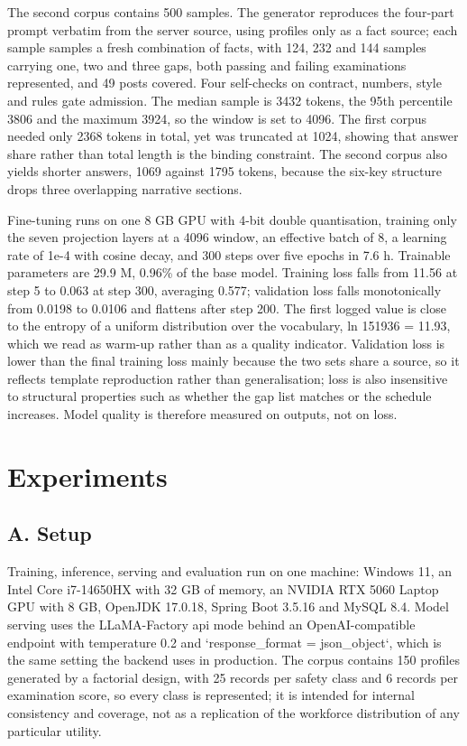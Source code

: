 \documentclass[conference]{IEEEtran}
\begin{document}
The second corpus contains 500 samples. The generator reproduces the four-part prompt verbatim from the server source, using profiles only as a fact source; each sample samples a fresh combination of facts, with 124, 232 and 144 samples carrying one, two and three gaps, both passing and failing examinations represented, and 49 posts covered. Four self-checks on contract, numbers, style and rules gate admission. The median sample is 3432 tokens, the 95th percentile 3806 and the maximum 3924, so the window is set to 4096. The first corpus needed only 2368 tokens in total, yet was truncated at 1024, showing that answer share rather than total length is the binding constraint. The second corpus also yields shorter answers, 1069 against 1795 tokens, because the six-key structure drops three overlapping narrative sections.


Fine-tuning runs on one 8 GB GPU with 4-bit double quantisation, training only the seven projection layers at a 4096 window, an effective batch of 8, a learning rate of 1e-4 with cosine decay, and 300 steps over five epochs in 7.6 h. Trainable parameters are 29.9 M, 0.96\% of the base model. Training loss falls from 11.56 at step 5 to 0.063 at step 300, averaging 0.577; validation loss falls monotonically from 0.0198 to 0.0106 and flattens after step 200. The first logged value is close to the entropy of a uniform distribution over the vocabulary, ln 151936 = 11.93, which we read as warm-up rather than as a quality indicator. Validation loss is lower than the final training loss mainly because the two sets share a source, so it reflects template reproduction rather than generalisation; loss is also insensitive to structural properties such as whether the gap list matches or the schedule increases. Model quality is therefore measured on outputs, not on loss.


\section{Experiments}

\subsection{A. Setup}

Training, inference, serving and evaluation run on one machine: Windows 11, an Intel Core i7-14650HX with 32 GB of memory, an NVIDIA RTX 5060 Laptop GPU with 8 GB, OpenJDK 17.0.18, Spring Boot 3.5.16 and MySQL 8.4. Model serving uses the LLaMA-Factory api mode behind an OpenAI-compatible endpoint with temperature 0.2 and `response\_format = json\_object`, which is the same setting the backend uses in production. The corpus contains 150 profiles generated by a factorial design, with 25 records per safety class and 6 records per examination score, so every class is represented; it is intended for internal consistency and coverage, not as a replication of the workforce distribution of any particular utility.
\end{document}
